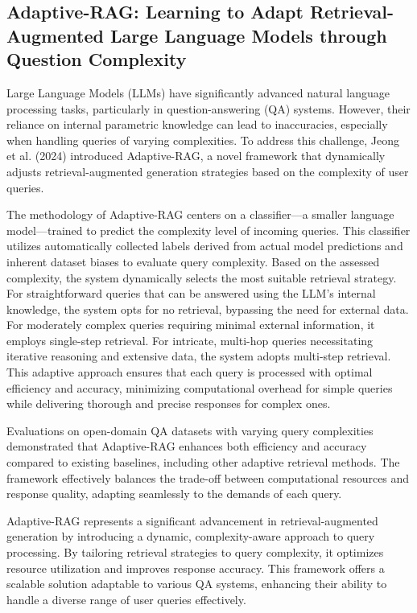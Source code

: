 \subsection{Adaptive-RAG: Learning to Adapt Retrieval-Augmented Large Language Models through Question Complexity}

Large Language Models (LLMs) have significantly advanced natural language processing tasks, particularly in question-answering (QA) systems. However, their reliance on internal parametric knowledge can lead to inaccuracies, especially when handling queries of varying complexities. To address this challenge, Jeong et al. (2024) introduced Adaptive-RAG, a novel framework that dynamically adjusts retrieval-augmented generation strategies based on the complexity of user queries.

The methodology of Adaptive-RAG centers on a classifier—a smaller language model—trained to predict the complexity level of incoming queries. This classifier utilizes automatically collected labels derived from actual model predictions and inherent dataset biases to evaluate query complexity. Based on the assessed complexity, the system dynamically selects the most suitable retrieval strategy. For straightforward queries that can be answered using the LLM's internal knowledge, the system opts for no retrieval, bypassing the need for external data. For moderately complex queries requiring minimal external information, it employs single-step retrieval. For intricate, multi-hop queries necessitating iterative reasoning and extensive data, the system adopts multi-step retrieval. This adaptive approach ensures that each query is processed with optimal efficiency and accuracy, minimizing computational overhead for simple queries while delivering thorough and precise responses for complex ones.

Evaluations on open-domain QA datasets with varying query complexities demonstrated that Adaptive-RAG enhances both efficiency and accuracy compared to existing baselines, including other adaptive retrieval methods. The framework effectively balances the trade-off between computational resources and response quality, adapting seamlessly to the demands of each query.

Adaptive-RAG represents a significant advancement in retrieval-augmented generation by introducing a dynamic, complexity-aware approach to query processing. By tailoring retrieval strategies to query complexity, it optimizes resource utilization and improves response accuracy. This framework offers a scalable solution adaptable to various QA systems, enhancing their ability to handle a diverse range of user queries effectively.

